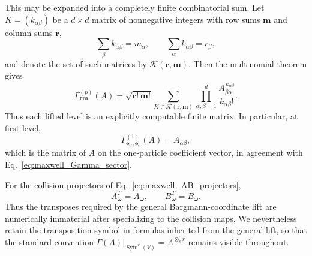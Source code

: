 \documentclass[11pt,oneside]{article}
\numberwithin{equation}{section}
\theoremstyle{definition}
\begin{document}
This may be expanded into a completely finite
combinatorial sum.  Let $K=(k_{\alpha\beta})$ be a $d\times d$ matrix of
nonnegative integers with row sums $\bm m$ and column sums $\bm r$,
\begin{equation}
\sum_{\beta}k_{\alpha\beta}=m_\alpha,
\qquad
\sum_{\alpha}k_{\alpha\beta}=r_\beta,
\end{equation}
and denote the set of such matrices by
$\mathcal K(\bm r,\bm m)$.  Then the multinomial theorem gives
\begin{equation}
\Gamma^{(p)}_{\bm r\bm m}(A)
=
\sqrt{\bm r!\,\bm m!}
\sum_{K\in\mathcal K(\bm r,\bm m)}
\prod_{\alpha,\beta=1}^{d}
\frac{A_{\beta\alpha}^{\,k_{\alpha\beta}}}
{k_{\alpha\beta}!}.
\label{eq:maxwell_Gamma_coeff_finite_sum}
\end{equation}
Thus each lifted level is an explicitly computable finite matrix.  In
particular, at first level,
\begin{equation}
\Gamma^{(1)}_{\bm e_\alpha,\bm e_\beta}(A)
=A_{\alpha\beta},
\label{eq:maxwell_Gamma_first_sector}
\end{equation}
which is the matrix of $A$ on the one-particle coefficient vector, in
agreement with Eq.~\eqref{eq:maxwell_Gamma_sector}.

For the collision projectors of Eq.~\eqref{eq:maxwell_AB_projectors},
\begin{equation}
A_{\bm\omega}^T=A_{\bm\omega},
\qquad
B_{\bm\omega}^T=B_{\bm\omega}.
\label{eq:maxwell_AB_symmetric}
\end{equation}
Thus the transposes required by the general Bargmann-coordinate lift are
numerically immaterial after specializing to the collision maps.  We
nevertheless retain the transposition symbol in formulas inherited from the
general lift, so that the standard convention
$\Gamma(A)|_{\operatorname{Sym}^r(V)}=A^{\otimes_s r}$ remains visible
throughout.
\end{document}
